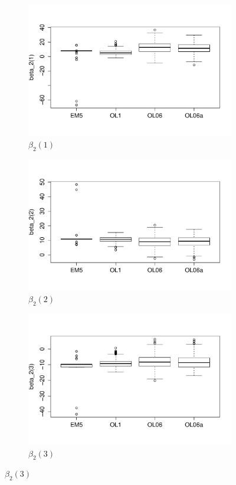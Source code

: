\documentclass[12pt]{article}
\begin{document}
\clearpage
\begin{figure}[h!]
\centering
\begin{subfigure}[t]{.6\textwidth}
\caption{$\beta_{2}(1)$}
\includegraphics[width = \textwidth]{fig2_beta1.PDF}
\end{subfigure}
\begin{subfigure}[t]{.6\textwidth}
\caption{$\beta_{2}(2)$}
\includegraphics[width = \textwidth]{fig2_beta2.PDF}
\end{subfigure}
\begin{subfigure}[t]{.6\textwidth}
\caption{$\beta_{2}(3)$}
\includegraphics[width = \textwidth]{fig2_beta3.PDF}

\end{subfigure}
\end{figure}
\end{document}
